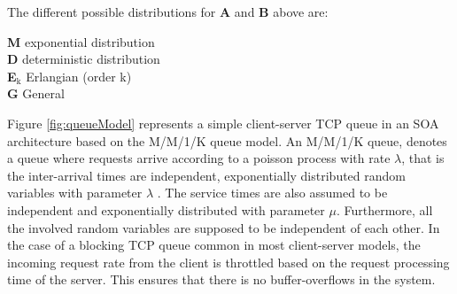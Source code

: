 The different possible distributions for \textbf{A} and \textbf{B} above are:

\begin{framed}
	\noindent \textbf{M} exponential distribution\\
	\textbf{D} deterministic distribution\\
	\textbf{E$_{\text{k}}$} Erlangian (order k)\\
	\textbf{G} General
\end{framed}



Figure \ref{fig:queueModel} represents a simple client-server TCP queue in an SOA architecture based on the M/M/1/K queue model.
An M/M/1/K queue, denotes a queue where requests arrive according to a poisson process with rate $\lambda$, that is the inter-arrival times are independent, exponentially distributed random variables with parameter $\lambda$ .
The service times are also assumed to be independent and exponentially distributed with parameter $\mu$. 
Furthermore, all the involved random variables are supposed to be independent of each other.
In the case of a blocking TCP queue common in most client-server models, the incoming request rate from the client is throttled based on the request processing time of the server. 
This ensures that there is no buffer-overflows in the system.


